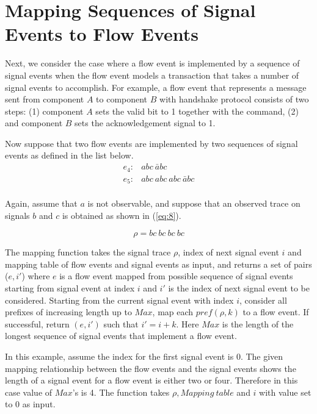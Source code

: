 \documentclass[12pt,frontmatter,copyright,thesis]{usfmanus}
\begin{document}
\section{Mapping Sequences of Signal Events to Flow Events}
Next, we consider the case where a flow event is implemented by
a sequence of signal events
when the flow event models a transaction that
takes a number of signal events to accomplish. For example,
a flow event that represents a message sent from component
$A$ to component $B$ with handshake protocol consists
of two steps: (1) component $A$ sets the valid bit to 1 together with
the command,
(2) and component $B$ sets the acknowledgement
signal to 1.

Now suppose that two
flow events are implemented by two sequences of signal events as
defined in the list below.
\[
\begin{array}{cl}
e_4: & abc\ \bar{a}bc\\
e_5: & abc\ abc\ abc\ \bar{a}bc\\
\end{array}
\] 

Again, assume that $a$ is not observable, and suppose that an observed trace
on signals $b$ and $c$ is obtained as shown in (\ref{eq:8}).

\begin{equation}
\label{eq:8}
\rho=bc\ bc\ bc \ bc
\end{equation}



The mapping function takes the signal trace $\rho$, index of next signal event $i$
and mapping table of flow events and signal events as
input, and returns a set of pairs ($e,i'$) where
$e$ is a flow event mapped from possible sequence of signal events
starting from signal event at index $i$ and $i'$ is
the index of next signal event to be considered.
Starting from the current signal event with index $i$, consider all prefixes of
increasing length up to $Max$, map each $pref(\rho,k)$ to
a flow event.
If successful, return $(e,i')$ such that $i'=i+k$.
Here $Max$ is the length of the longest sequence of signal events that implement a flow event.


In this example, assume the index for the first signal event is 0. 
The given mapping relationship between the flow events and the signal events shows
the length of a signal event for a flow event is either two or four. Therefore in this case
value of $Max$'s is 4.
The function takes $\rho, Mapping\ table$ and $i$ with value set to 0 as input.
\end{document}

